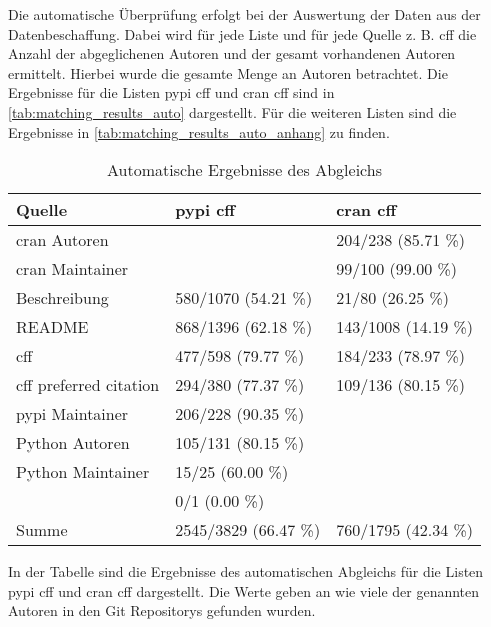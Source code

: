 Die automatische Überprüfung erfolgt bei der Auswertung der Daten aus der Datenbeschaffung.
Dabei wird für jede Liste und für jede Quelle z. B. \gls{cff} die Anzahl der abgeglichenen Autoren und der gesamt vorhandenen Autoren ermittelt.
Hierbei wurde die gesamte Menge an Autoren betrachtet.
Die Ergebnisse für die Listen \gls{pypi} \gls{cff} und \gls{cran} \gls{cff} sind in \autoref{tab:matching_results_auto} dargestellt.
Für die weiteren Listen sind die Ergebnisse in \autoref{tab:matching_results_auto_anhang} zu finden.

\begin{table}
    \centering
    \begin{tabularx}{\textwidth}{XR{3.8cm}R{3.8cm}}
        \toprule
        \textbf{Quelle}              & \textbf{\gls{pypi} \gls{cff}} & \textbf{\gls{cran} \gls{cff}} \\ \midrule
        \gls{cran} Autoren           &                               & 204/238 (85.71 \%)            \\
        \gls{cran} Maintainer        &                               & 99/100 (99.00 \%)             \\
        Beschreibung                 & 580/1070 (54.21 \%)           & 21/80 (26.25 \%)              \\
        README                       & 868/1396 (62.18 \%)           & 143/1008 (14.19 \%)           \\
        \gls{cff}                    & 477/598 (79.77 \%)            & 184/233 (78.97 \%)            \\
        \gls{cff} preferred citation & 294/380 (77.37 \%)            & 109/136 (80.15 \%)            \\
        \gls{pypi} Maintainer        & 206/228 (90.35 \%)            &                               \\
        Python Autoren               & 105/131 (80.15 \%)            &                               \\
        Python Maintainer            & 15/25 (60.00 \%)              &                               \\
                      & 0/1 (0.00 \%)                 &                               \\ \midrule
        Summe                        & 2545/3829 (66.47 \%)          & 760/1795 (42.34 \%)           \\
        \bottomrule
    \end{tabularx}
    \caption{Automatische Ergebnisse des Abgleichs}
    \label{tab:matching_results_auto}
    \small
    \raggedright
    In der Tabelle sind die Ergebnisse des automatischen Abgleichs für die Listen \gls{pypi} \gls{cff} und \gls{cran} \gls{cff} dargestellt. Die Werte geben an wie viele der genannten Autoren in den Git Repositorys gefunden wurden.
\end{table}

